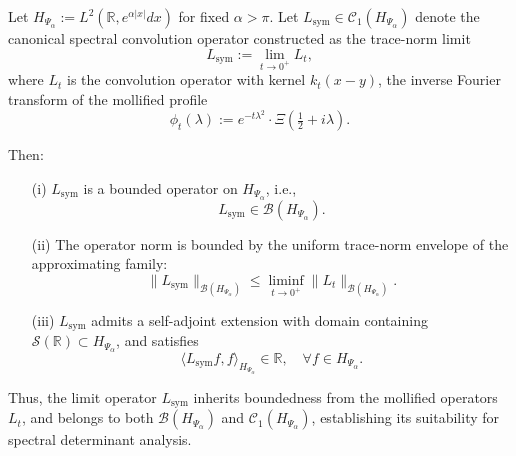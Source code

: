 \begin{lemma}
\label{lem:boundedness-Lsym}
Let \( H_{\Psi_\alpha} := L^2(\mathbb{R}, e^{\alpha|x|} dx) \) for fixed \( \alpha > \pi \). Let \( L_{\mathrm{sym}} \in \mathcal{C}_1(H_{\Psi_\alpha}) \) denote the canonical spectral convolution operator constructed as the trace-norm limit
\[
L_{\mathrm{sym}} := \lim_{t \to 0^+} L_t,
\]
where \( L_t \) is the convolution operator with kernel \( k_t(x - y) \), the inverse Fourier transform of the mollified profile
\[
\phi_t(\lambda) := e^{-t\lambda^2} \cdot \Xi\left( \tfrac{1}{2} + i\lambda \right).
\]

Then:
\begin{enumerate}
    \item[\textnormal{(i)}] \( L_{\mathrm{sym}} \) is a bounded operator on \( H_{\Psi_\alpha} \), i.e.,
    \[
    L_{\mathrm{sym}} \in \mathcal{B}(H_{\Psi_\alpha}).
    \]

    \item[\textnormal{(ii)}] The operator norm is bounded by the uniform trace-norm envelope of the approximating family:
    \[
    \| L_{\mathrm{sym}} \|_{\mathcal{B}(H_{\Psi_\alpha})} \le \liminf_{t \to 0^+} \| L_t \|_{\mathcal{B}(H_{\Psi_\alpha})}.
    \]

    \item[\textnormal{(iii)}] \( L_{\mathrm{sym}} \) admits a self-adjoint extension with domain containing \( \mathcal{S}(\mathbb{R}) \subset H_{\Psi_\alpha} \), and satisfies
    \[
    \langle L_{\mathrm{sym}} f, f \rangle_{H_{\Psi_\alpha}} \in \mathbb{R}, \quad \forall f \in H_{\Psi_\alpha}.
    \]
\end{enumerate}

\noindent
Thus, the limit operator \( L_{\mathrm{sym}} \) inherits boundedness from the mollified operators \( L_t \), and belongs to both \( \mathcal{B}(H_{\Psi_\alpha}) \) and \( \mathcal{C}_1(H_{\Psi_\alpha}) \), establishing its suitability for spectral determinant analysis.
\end{lemma}
% 
